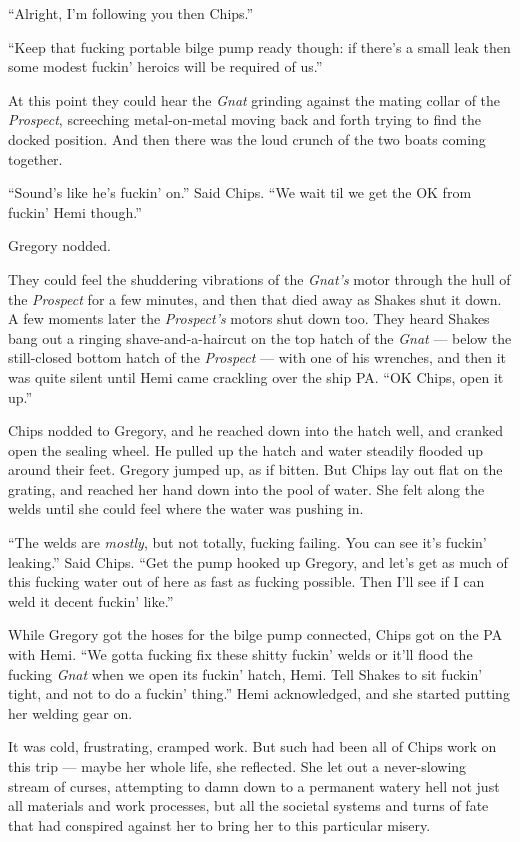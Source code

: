 \documentclass[]{scrbook}
\begin{document}
``Alright, I'm following you then Chips.''

``Keep that fucking portable bilge pump ready though: if there's a small
leak then some modest fuckin' heroics will be required of us.''

At this point they could hear the \emph{Gnat} grinding against the
mating collar of the \emph{Prospect}, screeching metal-on-metal moving
back and forth trying to find the docked position. And then there was
the loud crunch of the two boats coming together.

``Sound's like he's fuckin' on.'' Said Chips. ``We wait til we get the
OK from fuckin' Hemi though.''

Gregory nodded.

They could feel the shuddering vibrations of the \emph{Gnat's} motor
through the hull of the \emph{Prospect} for a few minutes, and then that
died away as Shakes shut it down. A few moments later the
\emph{Prospect's} motors shut down too. They heard Shakes bang out a
ringing shave-and-a-haircut on the top hatch of the \emph{Gnat} ---
below the still-closed bottom hatch of the \emph{Prospect} --- with one
of his wrenches, and then it was quite silent until Hemi came crackling
over the ship PA. ``OK Chips, open it up.''

Chips nodded to Gregory, and he reached down into the hatch well, and
cranked open the sealing wheel. He pulled up the hatch and water
steadily flooded up around their feet. Gregory jumped up, as if bitten.
But Chips lay out flat on the grating, and reached her hand down into
the pool of water. She felt along the welds until she could feel where
the water was pushing in.

``The welds are \emph{mostly}, but not totally, fucking failing. You can
see it's fuckin' leaking.'' Said Chips. ``Get the pump hooked up
Gregory, and let's get as much of this fucking water out of here as fast
as fucking possible. Then I'll see if I can weld it decent fuckin'
like.''

While Gregory got the hoses for the bilge pump connected, Chips got on
the PA with Hemi. ``We gotta fucking fix these shitty fuckin' welds or
it'll flood the fucking \emph{Gnat} when we open its fuckin' hatch,
Hemi. Tell Shakes to sit fuckin' tight, and not to do a fuckin' thing.''
Hemi acknowledged, and she started putting her welding gear on.

It was cold, frustrating, cramped work. But such had been all of Chips
work on this trip --- maybe her whole life, she reflected. She let out a
never-slowing stream of curses, attempting to damn down to a permanent
watery hell not just all materials and work processes, but all the
societal systems and turns of fate that had conspired against her to
bring her to this particular misery.
\end{document}
